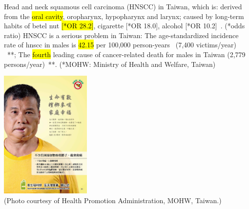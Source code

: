 \documentclass[
paper=landscape,
paper=160mm:90mm, %
fontsize=11pt, %
pagesize, %
parskip=half-, %
]{scrartcl} %
\theoremstyle{mythmstyle} %
\begin{document}
{\begin{minipage}[c]{0.60\linewidth}
\begin{outline}
    \1 Head and neck squamous cell carcinoma (HNSCC) in Taiwan, which is:
        \2 derived from the \hl{oral cavity}, oropharynx, hypopharynx and larynx;
        \2 caused by long-term habits of betel nut \hl{[*OR 28.2]}, cigarette [*OR 18.0], alcohol [*OR 10.2]~\autocite{Ko1995}. {\tiny (*odds ratio)}
    \1  HNSCC is a serious problem in Taiwan:
        \2 The age-standardized incidence rate of \acrshort{hnscc} in males is \hl{42.15} per 100,000 person-years~ (7,400 victims/year) ~\autocite{MOHWincidence2018}**;
        \2 The \hl{fourth} leading cause of cancer-related death for males in Taiwan (2,779 persons/year)~\autocite{MOHWdeath2017}**.
        {\tiny (*MOHW: Ministry of Health and Welfare, Taiwan)}
\end{outline}
\end{minipage}%
\begin{minipage}[c]{0.35\linewidth}
    \raggedright
    \hfill
    \includegraphics[width=4.5cm]{20369933_1755313531164078_5705495585669958017_o.jpg}\\
   \tiny (Photo courtesy of Health Promotion Administration, MOHW, Taiwan.)

\end{minipage}




\clearpage

\thispagestyle{headings}

}
\end{document}
